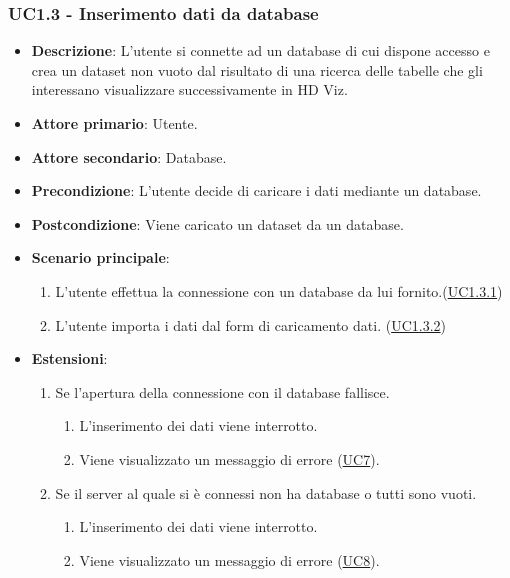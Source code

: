 \subsubsection{UC1.3 - Inserimento dati da database}
\label{ssub:uc1.3}
\begin{itemize}
    \item \textbf{Descrizione}: L'utente si connette ad un database di cui dispone accesso e 
                                crea un dataset non vuoto dal risultato di una ricerca delle tabelle che gli interessano
                                visualizzare successivamente in HD Viz.
    \item \textbf{Attore primario}: Utente.
    
    \item \textbf{Attore secondario}: Database.
    
    \item \textbf{Precondizione}:   L'utente decide di caricare i dati mediante un database. 
    \item \textbf{Postcondizione}:  Viene caricato un dataset da un database. 

	\item \textbf{Scenario principale}:
		\begin{enumerate}
			\item L'utente effettua la connessione con un database da lui fornito.(\hyperref[par:uc1.3.1]{UC1.3.1})
			\item L'utente importa i dati dal form di caricamento dati. (\hyperref[par:uc1.3.2]{UC1.3.2})
        \end{enumerate}

    \item \textbf{Estensioni}:
    \begin{enumerate}
        \item Se l'apertura della connessione con il database fallisce.
        \begin{enumerate}
            \item L'inserimento dei dati viene interrotto.
            \item Viene visualizzato un messaggio di errore (\hyperref[sub:uc7]{UC7}).
        \end{enumerate}

        \item Se il server al quale si è connessi non ha database o tutti sono vuoti.
        \begin{enumerate}
            \item L'inserimento dei dati viene interrotto.
            \item Viene visualizzato un messaggio di errore (\hyperref[sub:uc8]{UC8}).
        \end{enumerate}


\end{enumerate}
\end{itemize}
